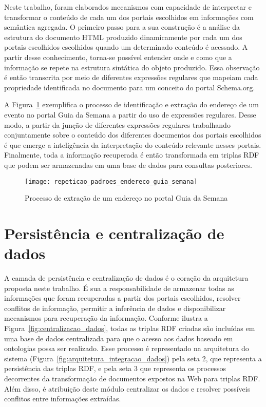 Neste trabalho, foram elaborados mecanismos com capacidade de interpretar e transformar o conteúdo de cada um dos portais escolhidos em informações com semântica agregada. O primeiro passo para a sua construção é a análise da estrutura do documento HTML produzido dinamicamente por cada um dos portais escolhidos escolhidos quando um determinado conteúdo é acessado. A partir desse conhecimento, torna-se possível entender onde e como que a informação se repete na estrutura sintática do objeto produzido. Essa observação é então transcrita por meio de diferentes expressões regulares que mapeiam cada propriedade identificada no documento para um conceito do portal Schema.org. 

A Figura~\ref{fig:repeticao_padroes_endereco_guia_semana} exemplifica o processo de identificação e extração do endereço de um evento no portal Guia da Semana a partir do uso de expressões regulares. Desse modo, a partir da junção de diferentes expressões regulares trabalhando conjuntamente sobre o conteúdo dos diferentes documentos dos portais escolhidos é que emerge a inteligência da interpretação do conteúdo relevante nesses portais. Finalmente, toda a informação recuperada é então transformada em triplas RDF que podem ser armazenadas em uma base de dados para consultas posteriores.

\begin{figure}[!hbt]
  \centering
  \texttt{[image: repeticao\_padroes\_endereco\_guia\_semana]} 
  \caption{Processo de extração de um endereço no portal Guia da Semana}
  \label{fig:repeticao_padroes_endereco_guia_semana} 
\end{figure}

\section{Persistência e centralização de dados}
\label{sec:persistencia_e_centralizacao_de_dados}

A camada de persistência e centralização de dados é o coração da arquitetura proposta neste trabalho. É sua  a responsabilidade de armazenar todas as informações que foram recuperadas a partir dos portais escolhidos, resolver conflitos de informação, permitir a inferência de dados e disponibilizar mecanismos para recuperação da informação. Conforme ilustra a Figura~\ref{fig:centralizacao_dados}, todas as triplas RDF criadas são incluídas em uma base de dados centralizada para que o acesso aos dados baseado em ontologias possa ser realizado. Esse processo é representado na arquitetura do sistema (Figura~\ref{fig:arquitetura_integracao_dados}) pela seta 2, que representa a persistência das triplas RDF, e pela seta 3 que representa os processos decorrentes da transformação de documentos expostos na Web para triplas RDF. Além disso, é atribuição deste módulo centralizar os dados e resolver possíveis conflitos entre informações extraídas.

